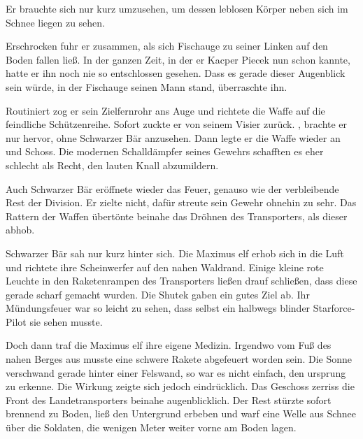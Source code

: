 \par

Er brauchte sich nur kurz umzusehen, um dessen leblosen Körper neben sich im Schnee liegen zu sehen.

\par

Erschrocken fuhr er zusammen, als sich Fischauge zu seiner Linken auf den Boden fallen ließ. In der ganzen Zeit, in der er Kacper Piecek nun schon kannte, hatte er ihn noch nie so entschlossen gesehen. Dass es gerade dieser Augenblick sein würde, in der Fischauge seinen Mann stand, überraschte ihn.

\par

Routiniert zog er sein Zielfernrohr ans Auge und richtete die Waffe auf die feindliche Schützenreihe. Sofort zuckte er von seinem Visier zurück. , brachte er nur hervor, ohne Schwarzer Bär anzusehen. Dann legte er die Waffe wieder an und Schoss. Die modernen Schalldämpfer seines Gewehrs schafften es eher schlecht als Recht, den lauten Knall abzumildern.

\par

Auch Schwarzer Bär eröffnete wieder das Feuer, genauso wie der verbleibende Rest der Division. Er zielte nicht, dafür streute sein Gewehr ohnehin zu sehr. Das Rattern der Waffen übertönte beinahe das Dröhnen des Transporters, als dieser abhob.

\par

Schwarzer Bär sah nur kurz hinter sich. Die Maximus elf erhob sich in die Luft und richtete ihre Scheinwerfer auf den nahen Waldrand. Einige kleine rote Leuchte in den Raketenrampen des Transporters ließen drauf schließen, dass diese gerade scharf gemacht wurden. Die Shutek gaben ein gutes Ziel ab. Ihr Mündungsfeuer war so leicht zu sehen, dass selbst ein halbwegs blinder Starforce-Pilot sie sehen musste.

\par

Doch dann traf die Maximus elf ihre eigene Medizin. Irgendwo vom Fuß des nahen Berges aus musste eine schwere Rakete abgefeuert worden sein. Die Sonne verschwand gerade hinter einer Felswand, so war es nicht einfach, den ursprung zu erkenne. Die Wirkung zeigte sich jedoch eindrücklich. Das Geschoss zerriss die Front des Landetransporters beinahe augenblicklich. Der Rest stürzte sofort brennend zu Boden, ließ den Untergrund erbeben und warf eine Welle aus Schnee über die Soldaten, die wenigen Meter weiter vorne am Boden lagen.

